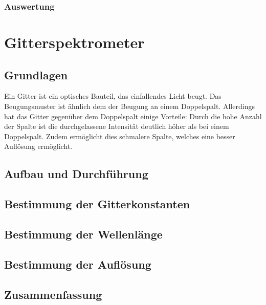 \documentclass[12pt,a4paper]{article}
\begin{document}
\subsubsection{Auswertung}



\newpage
\section{Gitterspektrometer}

\subsection{Grundlagen}
Ein Gitter ist ein optisches Bauteil, das einfallendes Licht beugt. Das Beugungsmuster ist ähnlich dem der Beugung an einem Doppelspalt. Allerdings hat das Gitter gegenüber dem Doppelspalt einige Vorteile: Durch die hohe Anzahl der Spalte ist die durchgelassene Intensität deutlich höher als bei einem Doppelspalt. Zudem ermöglicht dies schmalere Spalte, welches eine besser Auflösung ermöglicht.

\subsection{Aufbau und Durchführung}

\subsection{Bestimmung der Gitterkonstanten}

\subsection{Bestimmung der Wellenlänge}

\subsection{Bestimmung der Auflösung}

\subsection{Zusammenfassung}
\end{document}
